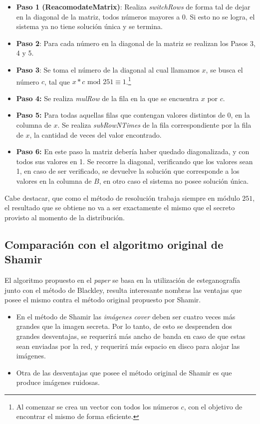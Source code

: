 \documentclass{article}
\begin{document}
\begin{itemize}
\item \textbf{Paso 1 (ReacomodateMatrix)}: Realiza \emph{switchRows} de forma tal de dejar en la diagonal de la matriz, todos números mayores a 0.
Si esto no se logra, el sistema ya no tiene solución única y se termina.
\item \textbf{Paso 2}: Para cada número en la diagonal de la matriz se realizan los Pasos 3, 4 y 5.
\item \textbf{Paso 3}: Se toma el número de la diagonal al cual llamamos $x$, se busca el número $c$, tal que 
$x * c \mbox{ mod } 251 \equiv 1$.\footnote{Al comenzar se crea un vector con todos los números $c$, con el objetivo de encontrar el mismo de forma eficiente.}
\item \textbf{Paso 4:} Se realiza \emph{mulRow} de la fila en la que se encuentra $x$ por $c$.
\item \textbf{Paso 5:} Para todas aquellas filas que contengan valores distintos de 0, en la columna de $x$. Se realiza \emph{subRowNTimes}
de la fila correspondiente por la fila de $x$, la cantidad de veces del valor encontrado.
\item \textbf{Paso 6:} En este paso la matriz debería haber quedado diagonalizada, y con todos sus valores en 1. Se recorre la diagonal, verificando
que los valores sean 1, en caso de ser verificado, se devuelve la solución que corresponde a los valores en la columna de $B$, en otro caso el
sistema no posee solución única.
\end{itemize}

Cabe destacar, que como el método de resolución trabaja siempre en módulo $251$, el resultado que se obtiene no va a ser exactamente
el mismo que el secreto provisto al momento de la distribución.

\subsection{Comparación con el algoritmo original de Shamir}

El algoritmo propuesto en el \emph{paper} se basa en la utilización de esteganografía junto con el método de Blackley, resulta interesante nombras las 
ventajas que posee el mismo contra el método original propuesto por Shamir.

\begin{itemize}
 \item En el método de Shamir las \emph{imágenes cover} deben ser cuatro veces más grandes que la imagen secreta. Por lo tanto, de esto
 se desprenden dos grandes desventajas, se requerirá más ancho de banda en caso de que estas sean enviadas por la red, y requerirá
 más espacio en disco para alojar las imágenes.
 \item Otra de las desventajas que posee el método original de Shamir es que produce imágenes ruidosas.
\end{itemize}
\end{document}
